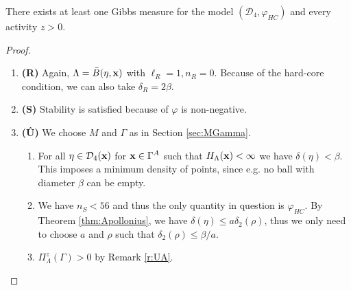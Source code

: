 \begin{theorem}\label{thm:E2}
	There exists at least one Gibbs measure for the model $(\mathcal D_4,\varphi_{HC})$ and every activity $z>0.$
\end{theorem}
\begin{proof}
\begin{enumerate}[]
	\item \textbf{(R)} Again, $\Lambda = \bar B(\eta,{\mathbf{x}})$ with $\ell_R = 1, n_R = 0$. Because of the hard-core condition, we can also take $\delta_R = 2\beta$.
	\item \textbf{(S)} Stability is satisfied because of $\varphi$ is non-negative.
	\item \textbf{(\^U)} We choose $M$ and $\Gamma$ as in Section \ref{sec:MGamma}.
		\begin{enumerate}[(\^U1)]
			\item For all $\eta \in \mathcal D_4({\mathbf{x}})$ for ${\mathbf{x}}\in\Gamma^A$ such that $H_\Lambda({\mathbf{x}})<\infty$ we have $\delta(\eta) < \beta$. This imposes a minimum density of points, since e.g. no ball with diameter $\beta$ can be empty. 
			\item We have $n_S<56$ and thus the only quantity in question is $\varphi_{HC}$. By Theorem \ref{thm:Apollonius}, we have $\delta(\eta)\leq a\delta_2(\rho)$, thus we only need to choose $a$ and $\rho$ such that $\delta_2(\rho) \leq \beta / a$.
			\item $\Pi^z_\Lambda(\Gamma)>0$ by Remark \ref{r:UA}.
		\end{enumerate}
\end{enumerate}
\end{proof}



